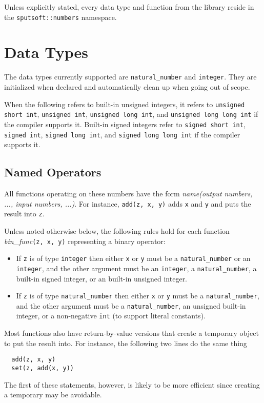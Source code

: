 \documentclass[a4paper]{article}
\begin{document}
Unless explicitly stated, every data type and function from the library reside in the \texttt{sputsoft::numbers} namespace.


\section{Data Types}

The data types currently supported are \texttt{natural\_number} and \texttt{integer}. They are initialized when declared and automatically clean up when going out of scope.

When the following refers to built-in unsigned integers, it refers to \texttt{unsigned short int}, \texttt{unsigned int}, \texttt{unsigned long int}, and \texttt{unsigned long long int} if the compiler supports it. Built-in signed integers refer to \texttt{signed short int}, \texttt{signed int}, \texttt{signed long int}, and \texttt{signed long long int} if the compiler supports it.

\subsection{Named Operators}

All functions operating on these numbers have the form \emph{name(output numbers, ..., input numbers, ...)}. For instance, \texttt{add(z, x, y)} adds \texttt{x} and \texttt{y} and puts the result into \texttt{z}.

Unless noted otherwise below, the following rules hold for each function \emph{bin\_func}\texttt{(z, x, y)} representing a binary operator:
\begin{itemize}
\item If \texttt{z} is of type \texttt{integer} then either \texttt{x} or \texttt{y} must be a \texttt{natural\_number} or an \texttt{integer}, and the other argument must be an \texttt{integer}, a \texttt{natural\_number}, a built-in signed integer, or an built-in unsigned integer.
\item If \texttt{z} is of type \texttt{natural\_number} then either \texttt{x} or \texttt{y} must be a \texttt{natural\_number}, and the other argument must be a \texttt{natural\_number}, an unsigned built-in integer, or a non-negative \texttt{int} (to support literal constants).
\end{itemize}

Most functions also have return-by-value versions that create a temporary object to put the result into. For instance, the following two lines do the same thing
\begin{verbatim}
  add(z, x, y)
  set(z, add(x, y))
\end{verbatim}
The first of these statements, however, is likely to be more efficient since creating a temporary may be avoidable.
\end{document}
